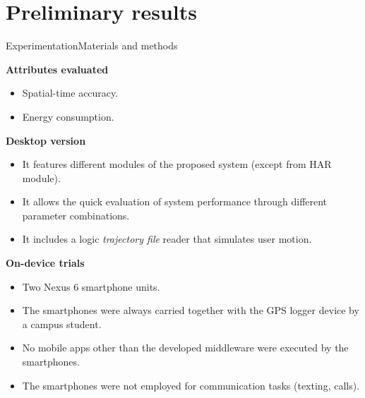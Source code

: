 \section{Preliminary results}
\begin{frame}{Experimentation}{Materials and methods}
\small
\begin{block}{\small \textbf{Attributes evaluated}}
  \begin{itemize}
    \item Spatial-time accuracy.
    \item Energy consumption.
  \end{itemize}
\end{block}

\begin{block}{\small \textbf{Desktop version}}
  \begin{itemize}
    \item It features different modules of the proposed system (except from HAR module).
    \item It allows the quick evaluation of system performance through different parameter combinations.
    \item It includes a logic \emph{trajectory file} reader that simulates user motion.
  \end{itemize}
\end{block}

\begin{block}{\small \textbf{On-device trials}}
\begin{itemize}
  \item Two Nexus 6 smartphone units.%
  \item The smartphones were always carried together with the GPS logger device by a campus student.
  \item No mobile apps other than the developed middleware were executed by the smartphones.
  \item The smartphones were not employed for communication tasks (texting, calls).
\end{itemize}
\end{block}
\end{frame}


